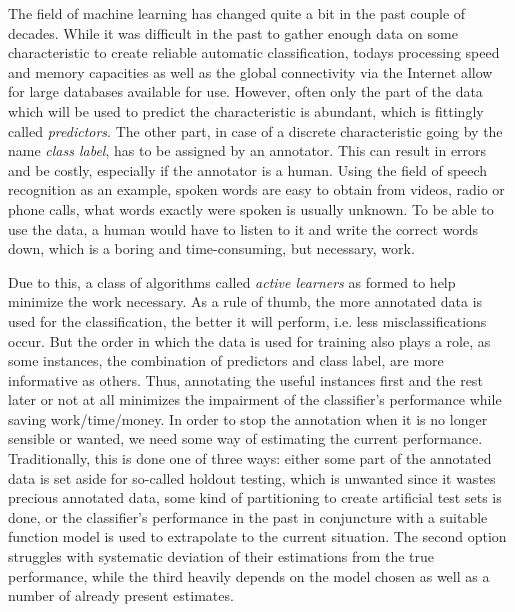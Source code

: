 
The field of machine learning has changed quite a bit in the past couple of decades. While it was difficult in the past to gather enough data on some characteristic to create reliable automatic classification, todays processing speed and memory capacities as well as the global connectivity via the Internet allow for large databases available for use. However, often only the part of the data which will be used to predict the characteristic is abundant, which is fittingly called \textit{predictors}. The other part, in case of a discrete characteristic going by the name \textit{class label}, has to be assigned by an annotator. This can result in errors and be costly, especially if the annotator is a human. Using the field of speech recognition as an example, spoken words are easy to obtain from videos, radio or phone calls, what words exactly were spoken is usually unknown. To be able to use the data, a human would have to listen to it and write the correct words down, which is a boring and time-consuming, but necessary, work.

Due to this, a class of algorithms called \textit{active learners} as formed to help minimize the work necessary. As a rule of thumb, the more annotated data is used for the classification, the better it will perform, i.e. less misclassifications occur. But the order in which the data is used for training also plays a role, as some instances, the combination of predictors and class label, are more informative as others. Thus, annotating the useful instances first and the rest later or not at all minimizes the impairment of the classifier's performance while saving work/time/money. In order to stop the annotation when it is no longer sensible or wanted, we need some way of estimating the current performance. Traditionally, this is done one of three ways: either some part of the annotated data is set aside for so-called holdout testing, which is unwanted since it wastes precious annotated data, some kind of partitioning to create artificial test sets is done, or the classifier's performance in the past in conjuncture with a suitable function model is used to extrapolate to the current situation. The second option struggles with systematic deviation of their estimations from the true performance, while the third heavily depends on the model chosen as well as a number of already present estimates.

